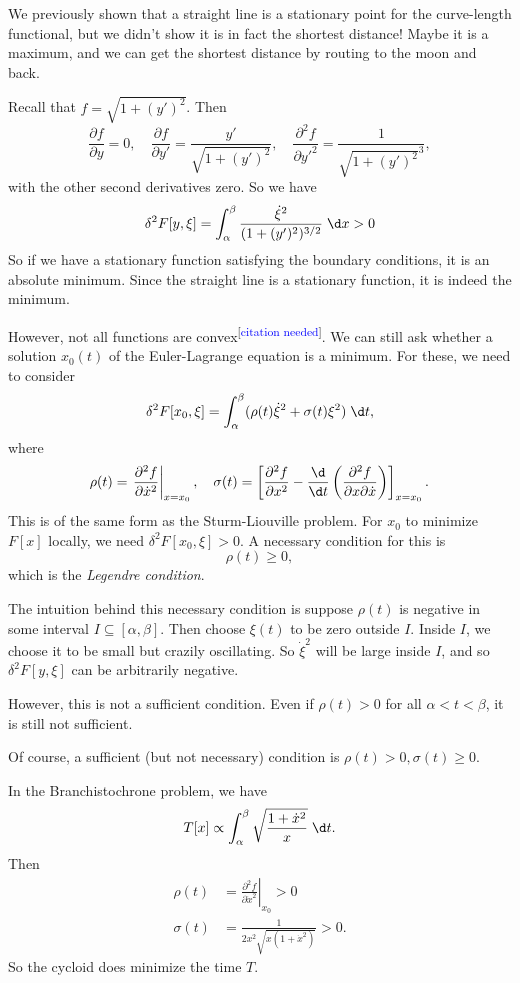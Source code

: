 \documentclass[a4paper]{article}
\begin{document}
\begin{eg}
  We previously shown that a straight line is a stationary point for the curve-length functional, but we didn't show it is in fact the shortest distance! Maybe it is a maximum, and we can get the shortest distance by routing to the moon and back.

  Recall that $f = \sqrt{1 + (y')^2}$. Then
  \[
    \frac{\partial f}{\partial y} = 0,\quad \frac{\partial f}{\partial y'} = \frac{y'}{\sqrt{1 + (y')^2}},\quad \frac{\partial^2 f}{\partial y'^2} = \frac{1}{\sqrt{1 + (y')^2}^3},
  \]
  with the other second derivatives zero. So we have
  \[
    \delta ^2 F[y, \xi] = \int_\alpha^\beta \frac{\dot{\xi}^2}{(1 + (y')^2)^{3/2}}\;\d x > 0
  \]
  So if we have a stationary function satisfying the boundary conditions, it is an absolute minimum. Since the straight line is a stationary function, it is indeed the minimum.
\end{eg}
However, not all functions are convex\textsuperscript{[\textcolor{blue}{citation needed}]}. We can still ask whether a solution $x_0(t)$ of the Euler-Lagrange equation is a minimum. For these, we need to consider
\[
  \delta^2 F[x_0, \xi] = \int_\alpha^\beta (\rho(t)\dot{\xi}^2 + \sigma(t) \xi^2)\;\d t,
\]
where
\[
  \rho(t) = \left.\frac{\partial^2 f}{\partial \dot{x}^2}\right|_{x = x_0},\quad
  \sigma(t) = \left[\frac{\partial^2 f}{\partial x^2} - \frac{\d}{\d t}\left(\frac{\partial^2 f}{\partial x \partial \dot{x}}\right)\right]_{x = x_0}.
\]
This is of the same form as the Sturm-Liouville problem. For $x_0$ to minimize $F[x]$ locally, we need $\delta^2 F[x_0, \xi] > 0$. A necessary condition for this is
\[
  \rho(t) \geq 0,
\]
which is the \emph{Legendre condition}.

The intuition behind this necessary condition is suppose $\rho (t)$ is negative in some interval $I \subseteq [\alpha, \beta]$. Then choose $\xi(t)$ to be zero outside $I$. Inside $I$, we choose it to be small but crazily oscillating. So $\dot{\xi}^2$ will be large inside $I$, and so $\delta^2 F[y, \xi]$ can be arbitrarily negative.

However, this is not a sufficient condition. Even if $\rho (t) > 0$ for all $\alpha < t < \beta$, it is still not sufficient.

Of course, a sufficient (but not necessary) condition is $\rho(t) > 0, \sigma(t) \geq 0$.

\begin{eg}
  In the Branchistochrone problem, we have
  \[
    T[x] \propto \int_\alpha^\beta \sqrt{\frac{1 + \dot{x}^2}{x}}\;\d t.
  \]
  Then
  \begin{align*}
    \rho(t) &= \left.\frac{\partial^2 f}{\partial \dot{x}^2}\right|_{x_0} > 0\\
    \sigma(t) &= \frac{1}{2x^2\sqrt{x(1 + \dot{x}^2)}} > 0.
  \end{align*}
  So the cycloid does minimize the time $T$.
\end{eg}
\end{document}
